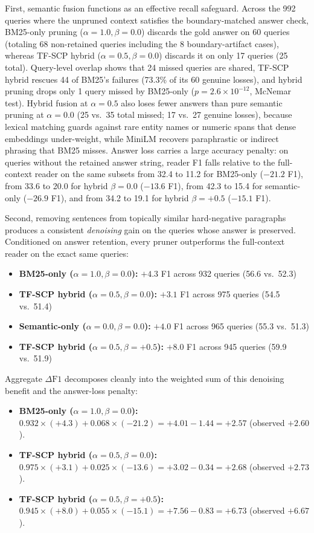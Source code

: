 \documentclass[conference]{IEEEtran}
\begin{document}
First, semantic fusion functions as an effective recall safeguard. Across the 992 queries where the unpruned context satisfies the boundary-matched answer check, BM25-only pruning ($\alpha = 1.0, \beta = 0.0$) discards the gold answer on 60 queries (totaling 68 non-retained queries including the 8 boundary-artifact cases), whereas TF-SCP hybrid ($\alpha = 0.5, \beta = 0.0$) discards it on only 17 queries (25 total). Query-level overlap shows that 24 missed queries are shared, TF-SCP hybrid rescues 44 of BM25's failures (73.3\% of its 60 genuine losses), and hybrid pruning drops only 1 query missed by BM25-only ($p = 2.6 \times 10^{-12}$, McNemar test). Hybrid fusion at $\alpha = 0.5$ also loses fewer answers than pure semantic pruning at $\alpha = 0.0$ (25 vs.\ 35 total missed; 17 vs.\ 27 genuine losses), because lexical matching guards against rare entity names or numeric spans that dense embeddings under-weight, while MiniLM recovers paraphrastic or indirect phrasing that BM25 misses. Answer loss carries a large accuracy penalty: on queries without the retained answer string, reader F1 falls relative to the full-context reader on the same subsets from 32.4 to 11.2 for BM25-only ($-21.2$ F1), from 33.6 to 20.0 for hybrid $\beta = 0.0$ ($-13.6$ F1), from 42.3 to 15.4 for semantic-only ($-26.9$ F1), and from 34.2 to 19.1 for hybrid $\beta = +0.5$ ($-15.1$ F1).

Second, removing sentences from topically similar hard-negative paragraphs produces a consistent \emph{denoising} gain on the queries whose answer is preserved. Conditioned on answer retention, every pruner outperforms the full-context reader on the exact same queries:
\begin{itemize}
    \item \textbf{BM25-only ($\alpha = 1.0, \beta = 0.0$):} $+4.3$ F1 across 932 queries (56.6 vs.\ 52.3)
    \item \textbf{TF-SCP hybrid ($\alpha = 0.5, \beta = 0.0$):} $+3.1$ F1 across 975 queries (54.5 vs.\ 51.4)
    \item \textbf{Semantic-only ($\alpha = 0.0, \beta = 0.0$):} $+4.0$ F1 across 965 queries (55.3 vs.\ 51.3)
    \item \textbf{TF-SCP hybrid ($\alpha = 0.5, \beta = +0.5$):} $+8.0$ F1 across 945 queries (59.9 vs.\ 51.9)
\end{itemize}

Aggregate $\Delta\mathrm{F1}$ decomposes cleanly into the weighted sum of this denoising benefit and the answer-loss penalty:
\begin{itemize}
    \item \textbf{BM25-only ($\alpha = 1.0, \beta = 0.0$):} $0.932 \times (+4.3) + 0.068 \times (-21.2) = +4.01 - 1.44 = +2.57$ (observed $+2.60$).
    \item \textbf{TF-SCP hybrid ($\alpha = 0.5, \beta = 0.0$):} $0.975 \times (+3.1) + 0.025 \times (-13.6) = +3.02 - 0.34 = +2.68$ (observed $+2.73$).
    \item \textbf{TF-SCP hybrid ($\alpha = 0.5, \beta = +0.5$):} $0.945 \times (+8.0) + 0.055 \times (-15.1) = +7.56 - 0.83 = +6.73$ (observed $+6.67$).
\end{itemize}
\end{document}
